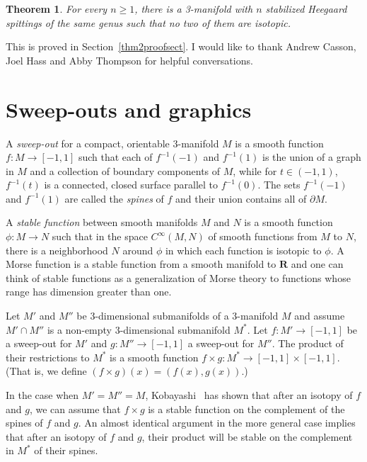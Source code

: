 \documentclass[12pt]{amsart}
\theoremstyle{plain}
\newtheorem{Thm}{Theorem}
\theoremstyle{definition}
\begin{document}
\begin{Thm}
\label{mainthm2}
For every $n \geq 1$, there is a 3-manifold with $n$ stabilized Heegaard spittings of the same genus such that no two of them are isotopic.
\end{Thm}

This is proved in Section~\ref{thm2proofsect}.  I would like to thank Andrew Casson, Joel Hass and Abby Thompson for helpful conversations.




\section{Sweep-outs and graphics}
\label{sweepsect}

A \textit{sweep-out} for a compact, orientable 3-manifold $M$ is a smooth function $f : M \rightarrow [-1,1]$ such that each of $f^{-1}(-1)$ and $f^{-1}(1)$ is the union of a graph in $M$ and a collection of boundary components of $M$, while for $t \in (-1,1)$, $f^{-1}(t)$ is a connected, closed surface parallel to $f^{-1}(0)$.  The sets $f^{-1}(-1)$ and $f^{-1}(1)$ are called the \textit{spines} of $f$ and their union contains all of $\partial M$.  

A \textit{stable function} between smooth manifolds $M$ and $N$ is a smooth function $\phi : M \rightarrow N$ such that in the space $C^\infty(M,N)$ of smooth functions from $M$ to $N$, there is a neighborhood $N$ around $\phi$ in which each function is isotopic to $\phi$.  A Morse function is a stable function from a smooth manifold to $\mathbf{R}$ and one can think of stable functions as a generalization of Morse theory to functions whose range has dimension greater than one.

Let $M'$ and $M''$ be 3-dimensional submanifolds of a 3-manifold $M$ and assume $M' \cap M''$ is a non-empty 3-dimensional submanifold $M^*$.  Let $f : M' \rightarrow [-1,1]$ be a sweep-out for $M'$ and $g : M'' \rightarrow [-1,1]$ a sweep-out for $M''$. The product of their restrictions to $M^*$ is a smooth function $f \times g : M^* \rightarrow [-1,1] \times [-1,1]$.  (That is, we define $(f \times g)(x) = (f(x),g(x))$.)  

In the case when $M' = M'' = M$, Kobayashi~\cite{Kob:disc} has shown that after an isotopy of $f$ and $g$, we can assume that $f \times g$ is a stable function on the complement of the spines of $f$ and $g$.  An almost identical argument in the more general case implies that after an isotopy of $f$ and $g$, their product will be stable on the complement in $M^*$ of their spines.
\end{document}
